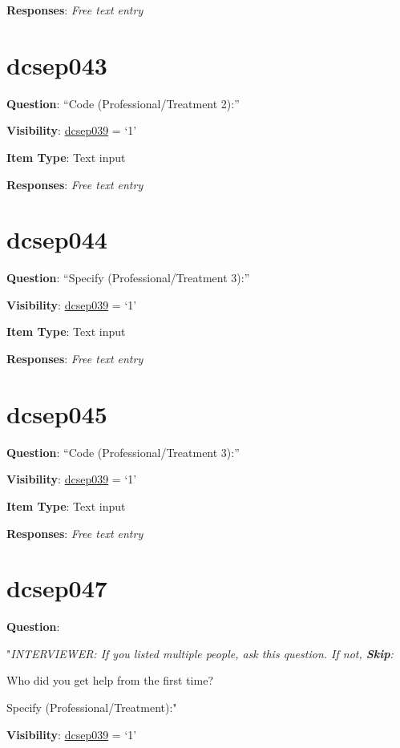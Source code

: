 \documentclass[]{book}
\begin{document}
\textbf{Responses}: \emph{Free text entry}

\hypertarget{dcsep043}{%
\section{dcsep043}\label{dcsep043}}

\textbf{Question}: ``Code (Professional/Treatment 2):''

\textbf{Visibility}: \protect\hyperlink{dcsep039}{dcsep039} = `1'

\textbf{Item Type}: Text input

\textbf{Responses}: \emph{Free text entry}

\hypertarget{dcsep044}{%
\section{dcsep044}\label{dcsep044}}

\textbf{Question}: ``Specify (Professional/Treatment 3):''

\textbf{Visibility}: \protect\hyperlink{dcsep039}{dcsep039} = `1'

\textbf{Item Type}: Text input

\textbf{Responses}: \emph{Free text entry}

\hypertarget{dcsep045}{%
\section{dcsep045}\label{dcsep045}}

\textbf{Question}: ``Code (Professional/Treatment 3):''

\textbf{Visibility}: \protect\hyperlink{dcsep039}{dcsep039} = `1'

\textbf{Item Type}: Text input

\textbf{Responses}: \emph{Free text entry}

\hypertarget{dcsep047}{%
\section{dcsep047}\label{dcsep047}}

\textbf{Question}:

"\emph{INTERVIEWER: If you listed multiple people, ask this question. If not, \textbf{Skip}:}

Who did you get help from the first time?

Specify (Professional/Treatment):"

\textbf{Visibility}: \protect\hyperlink{dcsep039}{dcsep039} = `1'
\end{document}
